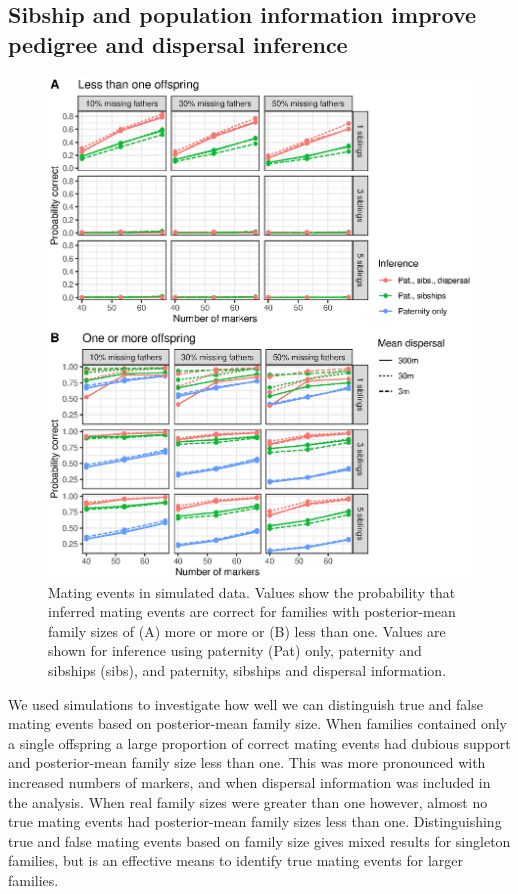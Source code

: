 \documentclass[10pt, a4paper, twocolumn]{article} %
\begin{document}
\subsection{Sibship and population information improve pedigree and dispersal inference}

\begin{figure}
    \centering
    \includegraphics{fig-sim_mating.eps}
    \caption{
        Mating events in simulated data.
        Values show the probability that inferred mating events are correct for families with posterior-mean family sizes of (A) more or more or (B) less than one.
        Values are shown for inference using paternity (Pat) only, paternity and sibships (sibs), and paternity, sibships and dispersal information.
    }
    \label{fig:sim-paternity}
\end{figure}

We used simulations to investigate how well we can distinguish true and false mating events based on posterior-mean family size.
When families contained only a single offspring a large proportion of correct mating events had dubious support and posterior-mean family size less than one.
This was more pronounced with increased numbers of markers, and when dispersal information was included in the analysis.
When real family sizes were greater than one however, almost no true mating events had posterior-mean family sizes less than one.
Distinguishing true and false mating events based on family size gives mixed results for singleton families, but is an effective means to identify true mating events for larger families.
\end{document}
